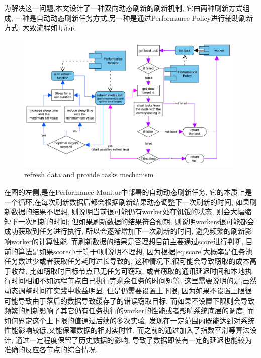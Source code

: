 \documentclass{mproj}
\begin{document}
为解决这一问题,本文设计了一种双向动态刷新的刷新机制,
它由两种刷新方式组成,
一种是自动动态刷新任务方式,另一种是通过Performance Policy进行辅助刷新方式.
大致流程如\cref{fig:refresh_provide}所示.

\begin{figure}[h]
    \centering %
    \includegraphics[width=0.98\textwidth]{images/refresh.pdf} %
    \caption{refresh data and provide tasks mechanism} %
    \label{fig:refresh_provide} %
\end{figure}
\FloatBarrier

在图的左侧,是在Performance Monitor中部署的自动动态刷新任务,
它的本质上是一个循环,在每次刷新数据后都会根据刷新结果动态调整下一次刷新的时间,
如果刷新数据的结果不理想,
则说明当前很可能仍有worker处在饥饿的状态,
则会大幅缩短下一次刷新的时间;
但如果刷新数据的结果符合预期,
则说明workers很可能都会成功获取到任务进行执行,
所以会逐渐增加下一次刷新的时间,
避免频繁的刷新影响worker的计算性能.
而刷新数据的结果是否理想目前主要通过score进行判断,
目前的算法是如果score小于等于0则说明不理想,
因为根据\cref{eq:score}大概率是任务池任务数过少或者获取任务耗时过长导致的,
这种情况下,很可能会导致窃取的成本高于收益,
比如窃取时目标节点已无任务可窃取,
或者窃取的通讯延迟时间和本地执行时间相加不如远程节点自己执行完剩余任务的时间短等.
这里需要说明的是,虽然动态调整时间在实践中收益明显,
但是仍需要设置上下限,
因为如果不设置上限很可能导致由于落后的数据导致缓存了的错误窃取目标,
而如果不设置下限则会导致频繁的刷新影响了其它仍有任务执行的worker的性能或者影响系统底层的调度,
而如何界定这个上下限的值通过后续的多次实验,
发现在一定范围内既能达到对系统性能影响较低,又能保障数据的相对实时性,
而之前的通过加入了指数平滑等算法设计,
通过一定程度保留了历史数据的影响,
导致了数据即使有一定的延迟也能较为准确的反应各节点的综合情况.
\end{document}
